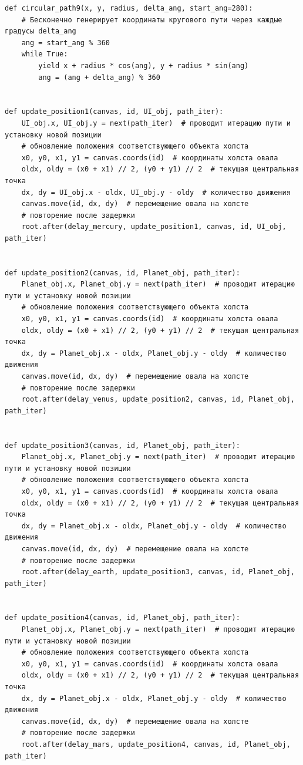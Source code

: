 \documentclass[11pt,a4paper]{report}
\begin{document}
\begin{verbatim}
def circular_path9(x, y, radius, delta_ang, start_ang=280):
    # Бесконечно генерирует координаты кругового пути через каждые градусы delta_ang
    ang = start_ang % 360
    while True:
        yield x + radius * cos(ang), y + radius * sin(ang)
        ang = (ang + delta_ang) % 360


def update_position1(canvas, id, UI_obj, path_iter):
    UI_obj.x, UI_obj.y = next(path_iter)  # проводит итерацию пути и установку новой позиции
    # обновление положения соответствующего объекта холста
    x0, y0, x1, y1 = canvas.coords(id)  # координаты холста овала
    oldx, oldy = (x0 + x1) // 2, (y0 + y1) // 2  # текущая центральная точка
    dx, dy = UI_obj.x - oldx, UI_obj.y - oldy  # количество движения
    canvas.move(id, dx, dy)  # перемещение овала на холсте
    # повторение после задержки
    root.after(delay_mercury, update_position1, canvas, id, UI_obj, path_iter)


def update_position2(canvas, id, Planet_obj, path_iter):
    Planet_obj.x, Planet_obj.y = next(path_iter)  # проводит итерацию пути и установку новой позиции
    # обновление положения соответствующего объекта холста
    x0, y0, x1, y1 = canvas.coords(id)  # координаты холста овала
    oldx, oldy = (x0 + x1) // 2, (y0 + y1) // 2  # текущая центральная точка
    dx, dy = Planet_obj.x - oldx, Planet_obj.y - oldy  # количество движения
    canvas.move(id, dx, dy)  # перемещение овала на холсте
    # повторение после задержки
    root.after(delay_venus, update_position2, canvas, id, Planet_obj, path_iter)


def update_position3(canvas, id, Planet_obj, path_iter):
    Planet_obj.x, Planet_obj.y = next(path_iter)  # проводит итерацию пути и установку новой позиции
    # обновление положения соответствующего объекта холста
    x0, y0, x1, y1 = canvas.coords(id)  # координаты холста овала
    oldx, oldy = (x0 + x1) // 2, (y0 + y1) // 2  # текущая центральная точка
    dx, dy = Planet_obj.x - oldx, Planet_obj.y - oldy  # количество движения
    canvas.move(id, dx, dy)  # перемещение овала на холсте
    # повторение после задержки
    root.after(delay_earth, update_position3, canvas, id, Planet_obj, path_iter)


def update_position4(canvas, id, Planet_obj, path_iter):
    Planet_obj.x, Planet_obj.y = next(path_iter)  # проводит итерацию пути и установку новой позиции
    # обновление положения соответствующего объекта холста
    x0, y0, x1, y1 = canvas.coords(id)  # координаты холста овала
    oldx, oldy = (x0 + x1) // 2, (y0 + y1) // 2  # текущая центральная точка
    dx, dy = Planet_obj.x - oldx, Planet_obj.y - oldy  # количество движения
    canvas.move(id, dx, dy)  # перемещение овала на холсте
    # повторение после задержки
    root.after(delay_mars, update_position4, canvas, id, Planet_obj, path_iter)



\end{verbatim}
\end{document}
